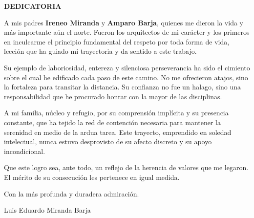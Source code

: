 \clearpage


\begin{center}
	\textbf{DEDICATORIA}
\end{center}
A mis padres \textbf{Ireneo Miranda} y \textbf{Amparo Barja}, quienes me dieron la vida y más importante aún el norte. Fueron los arquitectos de mi carácter y los primeros en inculcarme el principio fundamental del respeto por toda forma de vida, lección que ha guiado mi trayectoria y da sentido a este trabajo.

Su ejemplo de laboriosidad, entereza y silenciosa perseverancia ha sido el cimiento sobre el cual he edificado cada paso de este camino. No me ofrecieron atajos, sino la fortaleza para transitar la distancia. Su confianza no fue un halago, sino una responsabilidad que he procurado honrar con la mayor de las disciplinas.

A mi familia, núcleo y refugio, por su comprensión implícita y su presencia constante, que ha tejido la red de contención necesaria para mantener la serenidad en medio de la ardua tarea. Este trayecto, emprendido en soledad intelectual, nunca estuvo desprovisto de su afecto discreto y su apoyo incondicional.

Que este logro sea, ante todo, un reflejo de la herencia de valores que me legaron. El mérito de su consecución les pertenece en igual medida.

Con la más profunda y duradera admiración.
\begin{center}
	Luis Eduardo Miranda Barja
\end{center}
